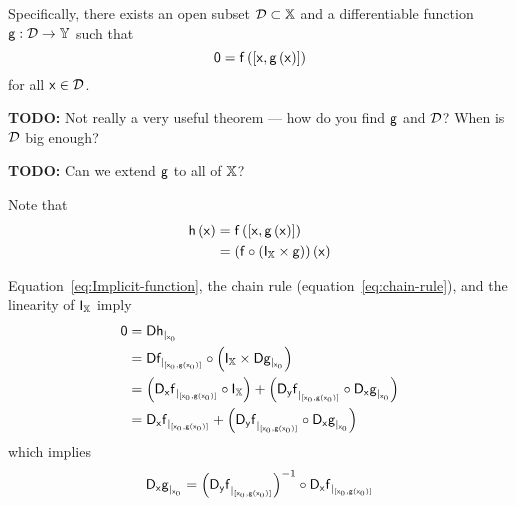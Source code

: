 Specifically, 
there exists an open subset $\mathcal{D}  \subset \mathbb{X}$
and a differentiable function $\mathsf{g} : \mathcal{D} \rightarrow \mathbb{Y}$
such that 
\begin{equation}\label{eq:Implicit-function}
\mathsf{0} = \mathsf{f}\left( \left[ \mathsf{x} , \mathsf{g} \left( \mathsf{x} \right) \right] \right)
\end{equation}
for all 
$\mathsf{x} \in  \mathcal{D}$.

\textbf{TODO:} Not really a very useful theorem --- 
how do you find $\mathsf{g}$ and $\mathcal{D}$?
When is $\mathcal{D}$ big enough?

\textbf{TODO:} Can we extend $\mathsf{g}$ to all of $\mathbb{X}$?

Note that 
\begin{equation}\label{eq:Implicit-derivative}
\begin{aligned}
\mathsf{h}\left(\mathsf{x}\right) 
& = 
\mathsf{f}\left( \left[ \mathsf{x} , \mathsf{g} \left( \mathsf{x} \right) \right] \right)
\\
& =
\left( \mathsf{f} \circ \left( \mathsf{I}_{\mathbb{X}} \times \mathsf{g} \right) \right) 
\left( \mathsf{x} \right)
\end{aligned} 
\end{equation}

Equation~\ref{eq:Implicit-function}, 
the chain rule (equation~\ref{eq:chain-rule}),
and the linearity of $\mathsf{I}_{\mathbb{X}}$
imply
\begin{equation}\label{eq:Implicit-derivative}
\begin{aligned}
\mathsf{0} & = {\mathsf{D}{\mathsf{h}}_{\mid_{\mathsf{x}_0}}}
\\
& = {\mathsf{D}{\mathsf{f}}_{\mid_{\left[ \mathsf{x}_0 , \mathsf{g}\left( \mathsf{x}_0 \right) \right]}}}
\circ \left( 
\mathsf{I}_{\mathbb{X}} 
\times 
{\mathsf{D}{\ensuremath{\mathsf{g}}}_{\mid_{\ensuremath{\mathsf{x}}_0}}}
\right)
\\
& = 
\left(
{\mathsf{D}_{\mathsf{x}}{\mathsf{f}}}_{\mid_{\left[ \mathsf{x}_0 , \mathsf{g}\left( \mathsf{x}_0 \right) \right]}}
\circ 
\mathsf{I}_{\mathbb{X}}
\right)
+ 
\left(
{\mathsf{D}_{\mathsf{y}}{\mathsf{f}}}_{\mid_{\left[ \mathsf{x}_0 , \mathsf{g}\left( \mathsf{x}_0 \right) \right]}}
\circ 
{\mathsf{D}_{\ensuremath{\mathsf{x}}}{\ensuremath{\mathsf{g}}}}_{\mid_{\mathsf{x}_0}}
\right)
\\
& = 
{\mathsf{D}_{\mathsf{x}}{\mathsf{f}}}_{\mid_{\left[ \mathsf{x}_0 , \mathsf{g}\left( \mathsf{x}_0 \right) \right]}}
+ 
\left(
{\mathsf{D}_{\mathsf{y}}{\mathsf{f}}}_{\mid_{\left[ \mathsf{x}_0 , \mathsf{g}\left( \mathsf{x}_0 \right) \right]}}
\circ 
{\mathsf{D}_{\ensuremath{\mathsf{x}}}{\ensuremath{\mathsf{g}}}}_{\mid_{\mathsf{x}_0}}
\right)
\end{aligned}
\end{equation}
which implies
\begin{equation}
{\mathsf{D}_{\ensuremath{\mathsf{x}}}{\ensuremath{\mathsf{g}}}}_{\mid_{\mathsf{x}_0}}
=
\left(
{\mathsf{D}_{\mathsf{y}}{\mathsf{f}}}_{\mid_{\left[ \mathsf{x}_0 , \mathsf{g}\left( \mathsf{x}_0 \right) \right]}}
\right)^{-1}
\circ 
{\mathsf{D}_{\ensuremath{\mathsf{x}}}{\ensuremath{\mathsf{f}}}}_{\mid_{\left[ \mathsf{x}_0 , \mathsf{g}\left( \mathsf{x}_0 \right) \right]}}
\end{equation}

